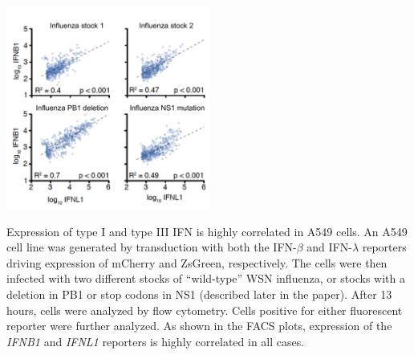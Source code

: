 \documentclass[9pt,lineno]{template}
\begin{document}
\begin{suppfig}
\includegraphics[width=0.5\textwidth]{figures/IFN_stochastic/IFN_reporter/IFNbeta_IFN_lambda_correlated.pdf}
\caption{
Expression of type I and type III IFN is highly correlated in A549 cells.
An A549 cell line was generated by transduction with both the IFN-$\beta$ and IFN-$\lambda$ reporters driving expression of mCherry and ZsGreen, respectively.
The cells were then infected with two different stocks of ``wild-type'' WSN influenza, or stocks with a deletion in PB1 or stop codons in NS1 (described later in the paper).
After 13 hours, cells were analyzed by flow cytometry.
Cells positive for either fluorescent reporter were further analyzed.
As shown in the FACS plots, expression of the \textit{IFNB1} and \textit{IFNL1} reporters is highly correlated in all cases.}
\label{suppfig:type_I_vs_III}
\end{suppfig}

\clearpage
\end{document}
